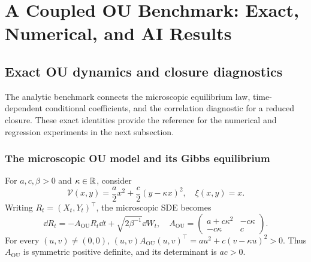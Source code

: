 \documentclass[12pt,a4paper,oneside]{book}
\begin{document}
\section{A Coupled OU Benchmark: Exact, Numerical, and AI Results}
\label{sec:benchmark}\label{ch:benchmark}

\subsection{Exact OU dynamics and closure diagnostics}
The analytic benchmark connects the microscopic equilibrium law,
time-dependent conditional coefficients, and the correlation diagnostic
for a reduced closure. These exact identities provide the reference
for the numerical and regression experiments in the next subsection.

\subsubsection{The microscopic OU model and its Gibbs equilibrium}
For $a,c,\beta>0$ and $\kappa\in\mathbb{R}$, consider
\begin{equation*}
\mathcal V(x,y)=\frac a2x^2+\frac c2(y-\kappa x)^2,
 \quad\xi(x,y)=x.
\end{equation*}
Writing $R_t=(X_t,Y_t)^\top$, the microscopic SDE becomes
\begin{equation}
 \dd R_t=-A_{\mathrm{OU}} R_t\dd t+\sqrt{2\beta^{-1}}\dd W_t,
 \quad A_{\mathrm{OU}}=\begin{pmatrix}a+c\kappa^2&-c\kappa\\-c\kappa&c\end{pmatrix}.
\label{eq:ouSDE}
\end{equation}
For every $(u,v)\ne(0,0)$,
$(u,v)A_{\mathrm{OU}}(u,v)^\top=au^2+c(v-\kappa u)^2>0$.
Thus $A_{\mathrm{OU}}$ is symmetric positive definite, and its determinant is $ac>0$.
\end{document}
